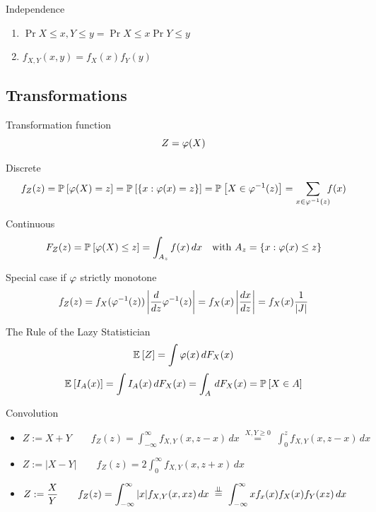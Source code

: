 \documentclass[landscape]{article}
\begin{document}
\begin{multicols*}{2}
Independence
\begin{enumerate}
  \item $\Pr{X \le x, Y \le y} = \Pr{X \le x}\Pr{Y \le y}$
  \item $f_{X,Y}(x,y) = f_X(x)f_Y(y)$
\end{enumerate}

\subsection{Transformations}

Transformation function 
$$Z = \varphi(X)$$

Discrete
$$f_Z(z) = \mathbb{P}_{}\left[\varphi(X) = z\right] = \mathbb{P}_{}\left[\{x:\varphi(x) = z\}\right] 
= \mathbb{P}_{}\left[X \in \varphi^{-1}(z)\right] = \sum_{x \in \varphi^{-1}(z)} \!\!\!f(x)$$

Continuous
$$F_Z(z) = \mathbb{P}_{}\left[\varphi(X) \le z\right] = \int_{A_z} f(x) \,dx \quad 
    \text{with } A_z = \{x:\varphi(x) \le z\}$$

Special case if $\varphi$ strictly monotone
$$f_Z(z) 
    = f_X(\varphi^{-1}(z)) 
      \left|\frac{d}{dz}\varphi^{-1}(z)\right|
    = f_X(x)\left|\frac{dx}{dz}\right|
    = f_X(x)\frac{1}{|J|}$$
        
The Rule of the Lazy Statistician
$$\mathbb{E}_{}\left[Z\right] = \int \varphi(x) \,dF_X(x)$$
$$\mathbb{E}_{}\left[I_A(x)\right] = \int I_A(x) \,dF_X(x) = \int_A \,dF_X(x) = \mathbb{P}_{}\left[X \in A\right]$$

Convolution
\begin{itemize}
  \item $ Z:=X+Y \qquad 
    f_Z(z)=\displaystyle\int_{-\infty}^{\infty} f_{X,Y}(x,z-x)\,dx
    \;\stackrel{X,Y \ge 0}{=}\; \int_0^z f_{X,Y}(x,z-x)\,dx$
  \item $ Z:=|X-Y| \qquad 
    f_Z(z)=\displaystyle2\int_0^\infty f_{X,Y}(x,z+x)\,dx$
  \item $ Z:=\displaystyle\frac{X}{Y} \qquad 
    f_Z(z)=\displaystyle\int_{-\infty}^{\infty} |x| f_{X,Y}(x,xz)\,dx
    \;\stackrel{\perp\!\!\!\perp}{=}\; \int_{-\infty}^{\infty} xf_x(x)f_X(x)f_Y(xz)\,dx$
\end{itemize}



\end{multicols*}
\end{document}
